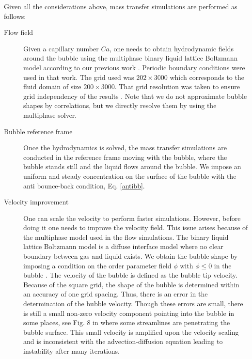 \documentclass{article}
\begin{document}
Given all the considerations above, mass transfer simulations are performed as follows:
\begin{description}
 \item[Flow field] Given a capillary number $Ca$, one needs to obtain hydrodynamic fields around
the bubble using the multiphase binary liquid lattice Boltzmann model according to our previous work
\cite{kuzmin-binary2d}. Periodic boundary conditions were used in that work. The grid used  was
$202\times 3000$ which corresponds to the fluid domain  of size $200\times3000$. That grid resolution was
taken to ensure grid
independency of the results \cite{kuzmin-binary2d}. Note that we do not approximate bubble shapes by correlations, but we directly resolve them by using the multiphase solver. 
 \item[Bubble reference frame] Once the hydrodynamics is solved, the mass transfer simulations
are conducted in the reference frame moving with the bubble, where the bubble stands still and the liquid
flows around the
bubble. We impose an uniform and steady concentration on the surface
of the bubble with the anti bounce-back condition, Eq. \ref{antibb}.
 \item[Velocity improvement] One can scale the velocity to
perform faster simulations. However, before doing it one needs to improve the velocity field.
This issue arises because of the
multiphase model used in the flow simulations. The binary liquid lattice Boltzmann model is a diffuse
interface model where no clear boundary between gas and liquid exists.
We obtain the bubble shape by imposing a condition on the order parameter field $\phi$ with $\phi\leq0$ in the bubble \cite{kuzmin-binary2d}. The velocity of the
bubble is defined as the bubble tip velocity. Because of the square grid, the shape of the bubble is determined within an accuracy of one grid spacing. Thus,
there is an error in the determination of the bubble velocity. Though these errors are small,
there is still a small non-zero velocity component pointing into the bubble in some places, see Fig. 8 in
\cite{kuzmin-binary2d} where some streamlines are penetrating the bubble surface.
This small velocity is amplified upon the velocity scaling and is inconsistent with the
advection-diffusion equation leading to instability after many iterations.


\end{description}
\end{document}

